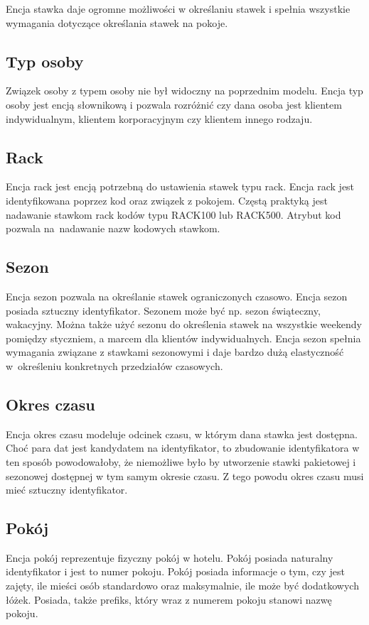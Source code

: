 \documentclass[a4paper,onecolumn,oneside,11pt,wide,floatssmall]{mwrep}
\theoremstyle{definition}
\theoremstyle{plain}%
\theoremstyle{remark}
\begin{document}
Encja stawka daje ogromne możliwości w określaniu stawek i spełnia wszystkie wymagania dotyczące określania stawek na pokoje. 

\subsection{Typ osoby}
Związek osoby z typem osoby nie był widoczny na poprzednim modelu. Encja typ osoby jest encją słownikową i pozwala rozróżnić czy dana osoba jest klientem indywidualnym, klientem korporacyjnym czy klientem innego rodzaju. 

\subsection{Rack}
Encja rack jest encją potrzebną do ustawienia stawek typu rack. Encja rack jest identyfikowana poprzez kod oraz związek z pokojem. Częstą praktyką jest nadawanie stawkom rack kodów typu RACK100 lub RACK500. Atrybut kod pozwala \mbox{na nadawanie} nazw kodowych stawkom.

\subsection{Sezon}
Encja sezon pozwala na określanie stawek ograniczonych czasowo. Encja sezon posiada sztuczny identyfikator. Sezonem może być np. sezon świąteczny, wakacyjny. Można także użyć sezonu do określenia stawek na wszystkie weekendy pomiędzy styczniem, a marcem dla klientów indywidualnych. Encja sezon spełnia wymagania związane z stawkami sezonowymi i daje bardzo dużą elastyczność \mbox{w określeniu} konkretnych przedziałów czasowych.

\subsection{Okres czasu}
Encja okres czasu modeluje odcinek czasu, w którym dana stawka jest dostępna. Choć para dat jest kandydatem na identyfikator, to zbudowanie identyfikatora w ten sposób powodowałoby, że niemożliwe było by utworzenie stawki pakietowej i sezonowej dostępnej w tym samym okresie czasu. Z tego powodu okres czasu musi mieć sztuczny identyfikator.

\subsection{Pokój}
Encja pokój reprezentuje fizyczny pokój w hotelu. Pokój posiada naturalny identyfikator i jest to numer pokoju. Pokój posiada informacje o tym, czy jest zajęty, ile mieści osób standardowo oraz maksymalnie, ile może być dodatkowych łóżek. Posiada, także prefiks, który wraz z numerem pokoju stanowi nazwę pokoju.
\end{document}
